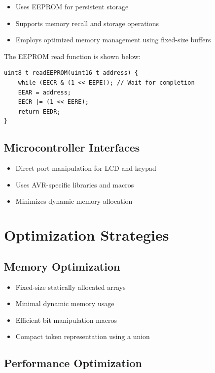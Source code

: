 \documentclass[journal]{IEEEtran}
\numberwithin{equation}{enumi}
\numberwithin{figure}{enumi}
\begin{document}
\begin{itemize}
    \item Uses EEPROM for persistent storage
    \item Supports memory recall and storage operations
    \item Employs optimized memory management using fixed-size buffers
\end{itemize}

The EEPROM read function is shown below:

\begin{lstlisting}[caption=EEPROM Read Function, label=lst:eeprom]
uint8_t readEEPROM(uint16_t address) {
    while (EECR & (1 << EEPE)); // Wait for completion
    EEAR = address;
    EECR |= (1 << EERE);
    return EEDR;
}
\end{lstlisting}

\subsection{Microcontroller Interfaces}

\begin{itemize}
    \item Direct port manipulation for LCD and keypad
    \item Uses AVR-specific libraries and macros
    \item Minimizes dynamic memory allocation
\end{itemize}

\section{Optimization Strategies}

\subsection{Memory Optimization}

\begin{itemize}
    \item Fixed-size statically allocated arrays
    \item Minimal dynamic memory usage
    \item Efficient bit manipulation macros
    \item Compact token representation using a union
\end{itemize}

\subsection{Performance Optimization}
\end{document}
